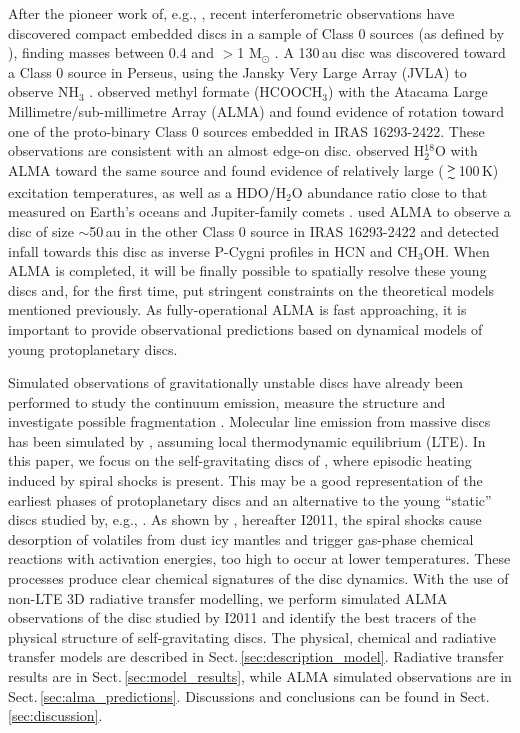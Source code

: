 \documentclass[useAMS,usenatbib]{mn2e}
\begin{document}
After the pioneer work of, e.g., \citet{Chandler1995,Brown2000,Looney2000}, recent interferometric observations have discovered compact embedded discs in a sample of Class 0 sources (as defined by \citealt{Andre1999}), finding masses between 0.4 and  $>$1 M$_{\odot}$ \citep{Jorgensen2007,Jorgensen2009,Enoch2011}. A 130\,au disc was discovered toward a Class 0 source in Perseus, using the Jansky Very Large Array (JVLA) to observe NH$_3$ \citep{Choi2007}. \citet{Pineda2012} observed methyl formate (HCOOCH$_3$) with the Atacama Large Millimetre/sub-millimetre Array (ALMA) and found evidence of rotation toward one of the proto-binary Class 0 sources embedded in IRAS 16293-2422. These observations are consistent with an almost edge-on disc. \citet{Persson2012} observed H$_2^{18}$O with ALMA toward the same source and found evidence of relatively large ($\ga$100\,K) excitation temperatures, as well as a HDO/H$_2$O abundance ratio close to that measured on Earth's oceans and Jupiter-family comets \citep{Hartogh2012}. \citet{Zapata2013} used ALMA to observe a disc of size $\sim$50$\,$au in the other Class 0 source in IRAS 16293-2422 and detected infall towards this disc as inverse P-Cygni profiles in HCN and CH$_3$OH. When ALMA is completed, it will be finally possible to spatially resolve these young discs and, for the first time, put stringent constraints on the theoretical models mentioned previously. As fully-operational ALMA is fast approaching, it is important to provide observational predictions based on dynamical models of young protoplanetary discs. \smallskip 

Simulated observations of gravitationally unstable discs have already been performed to study the continuum emission, measure the structure and investigate possible fragmentation \citep{Cossins2010,Ruge2013}. Molecular line emission from massive discs has been simulated by \citet{Krumholz2007}, assuming local thermodynamic equilibrium (LTE). In this paper, we focus on the self-gravitating discs of \citet{Boley2008}, where episodic heating induced by spiral shocks is present. This may be a good representation of the earliest phases of protoplanetary discs and an alternative to the young ``static'' discs studied by, e.g., \citet{Visser2009,Visser2011}. As shown by \citet{Ilee2011}, hereafter I2011, the spiral shocks cause desorption of volatiles from dust icy mantles and trigger gas-phase chemical reactions with activation energies, too high to occur at lower temperatures. These processes produce clear chemical signatures of the disc dynamics. With the use of non-LTE 3D radiative transfer modelling, we perform simulated ALMA observations of the disc studied by I2011 and identify the best tracers of the physical structure of self-gravitating discs. The physical, chemical and radiative transfer models are described in Sect.\,\ref{sec:description_model}. Radiative transfer results are in Sect.\,\ref{sec:model_results}, while ALMA simulated observations are in Sect.\,\ref{sec:alma_predictions}. Discussions and conclusions can be found in Sect.\,\ref{sec:discussion}. 
\end{document}
